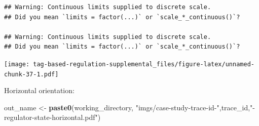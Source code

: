 \documentclass[]{book}
\newenvironment{Shaded}{\begin{snugshade}}{\end{snugshade}}
\newcommand{\KeywordTok}[1]{\textcolor[rgb]{0.13,0.29,0.53}{\textbf{#1}}}
\newcommand{\NormalTok}[1]{#1}
\newcommand{\StringTok}[1]{\textcolor[rgb]{0.31,0.60,0.02}{#1}}
\begin{document}
\begin{verbatim}
## Warning: Continuous limits supplied to discrete scale.
## Did you mean `limits = factor(...)` or `scale_*_continuous()`?

## Warning: Continuous limits supplied to discrete scale.
## Did you mean `limits = factor(...)` or `scale_*_continuous()`?
\end{verbatim}

\texttt{[image: tag-based-regulation-supplemental\_files/figure-latex/unnamed-chunk-37-1.pdf]}

Horizontal orientation:

\begin{Shaded}
\begin{Highlighting}[]
\NormalTok{out_name <-}\StringTok{ }\KeywordTok{paste0}\NormalTok{(working_directory, }\StringTok{"imgs/case-study-trace-id-"}\NormalTok{,trace_id,}\StringTok{"-regulator-state-horizontal.pdf"}\NormalTok{)}


\end{Highlighting}
\end{Shaded}
\end{document}
